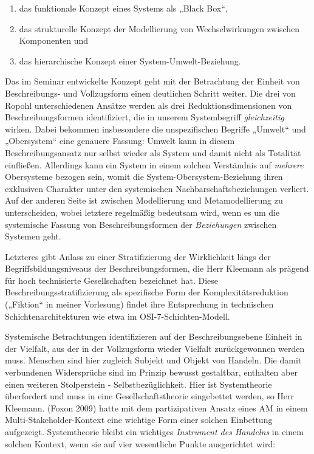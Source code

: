 \documentclass[11pt,a4paper]{article}
\begin{document}
\begin{enumerate}[noitemsep]
\item das funktionale Konzept eines Systems als „Black Box“,
\item das strukturelle Konzept der Modellierung von Wechselwirkungen zwischen
  Komponenten und
\item das hierarchische Konzept einer System-Umwelt-Beziehung.
\end{enumerate}

Das im Seminar entwickelte Konzept geht mit der Betrachtung der Einheit von
Beschreibungs- und Vollzugsform einen deutlichen Schritt weiter. Die drei von
Ropohl unterschiedenen Ansätze werden als drei Reduktionsdimensionen von
Beschreibungsformen identifiziert, die in unserem Systembegriff
\emph{gleichzeitig} wirken. Dabei bekommen insbesondere die unspezifischen
Begriffe „Umwelt“ und „Obersystem“ eine genauere Fassung: Umwelt kann in
diesem Beschreibungsansatz nur selbst wieder als System und damit nicht als
Totalität einfließen.  Allerdings kann ein System in einem solchen Verständnis
auf \emph{mehrere} Obersysteme bezogen sein, womit die
System-Obersystem-Beziehung ihren exklusiven Charakter unter den systemischen
Nachbarschaftsbeziehungen verliert. Auf der anderen Seite ist zwischen
Modellierung und Metamodellierung zu unterscheiden, wobei letztere regelmäßig
bedeutsam wird, wenn es um die systemische Fassung von Beschreibungsformen der
\emph{Beziehungen} zwischen Systemen geht.

Letzteres gibt Anlass zu einer Stratifizierung der Wirklichkeit längs der
Begriffsbildungsniveaus der Beschreibungsformen, die Herr Kleemann als prägend
für hoch technisierte Gesellschaften bezeichnet hat. Diese
Beschreibungsstratifizierung als spezifische Form der Komplexitätsreduktion
(„Fiktion“ in meiner Vorlesung) findet ihre Entsprechung in technischen
Schichtenarchitekturen wie etwa im OSI-7-Schichten-Modell.

Systemische Betrachtungen identifizieren auf der Beschreibungsebene Einheit in
der Vielfalt, aus der in der Vollzugsform wieder Vielfalt zurückgewonnen
werden muss. Menschen sind hier zugleich Subjekt und Objekt von Handeln. Die
damit verbundenen Widersprüche sind im Prinzip bewusst gestaltbar, enthalten
aber einen weiteren Stolperstein - Selbstbezüglichkeit. Hier ist Systemtheorie
überfordert und muss in eine Gesellschaftstheorie eingebettet werden, so Herr
Kleemann. (Foxon 2009) hatte mit dem partizipativen Ansatz eines AM in einem
Multi-Stakeholder-Kontext eine wichtige Form einer solchen Einbettung
aufgezeigt. Systemtheorie bleibt ein wichtiges \emph{Instrument des Handelns}
in einem solchen Kontext, wenn sie auf vier wesentliche Punkte ausgerichtet
wird:
\end{document}

